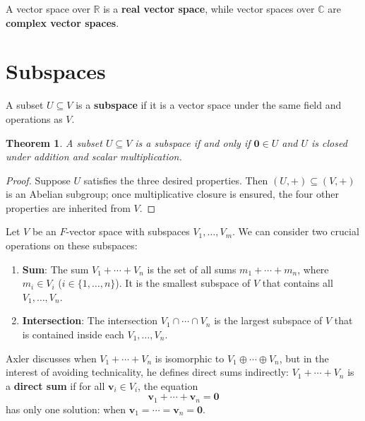 \documentclass[11pt]{article}
\newtheorem{theorem}{Theorem}
\renewcommand{\vec}[1]{\mathbf{#1}}
\begin{document}
A vector space over $\mathbb{R}$ is a \textbf{real vector space}, while vector spaces over $\mathbb{C}$ are \textbf{complex vector spaces}.


\section{Subspaces}

A subset $U \subseteq V$ is a \textbf{subspace} if it is a vector space under the same field and operations as $V$.

\begin{adjustwidth}{0.5cm}{}
  \begin{theorem}
    A subset $U \subseteq V$ is a subspace if and only if $\vec{0} \in U$ and $U$ is closed under addition and scalar multiplication.
  \end{theorem}
  \begin{proof}
    Suppose $U$ satisfies the three desired properties. Then $(U, +) \subseteq (V, +)$ is an Abelian subgroup; once multiplicative closure is ensured, the four other properties are inherited from $V$.
  \end{proof}
\end{adjustwidth}

Let $V$ be an $F$-vector space with subspaces $V_{1}, \ldots, V_{m}$. We can consider two crucial operations on these subspaces: 

\begin{enumerate}
	\item \textbf{Sum}: The sum $V_{1} + \cdots + V_{n}$ is the set of all sums $m_{1} + \cdots + m_{n}$, where $m_{i} \in V_{i}$ ($i \in \{ 1, \ldots, n \}$). It is the smallest subspace of $V$ that contains all $V_{1}, \ldots, V_{n}$.
	\item \textbf{Intersection}: The intersection $V_{1} \cap \cdots \cap V_{n}$ is the largest subspace of $V$ that is contained inside each $V_{1}, \ldots, V_{n}$.
\end{enumerate}

Axler discusses when $V_{1} + \cdots + V_{n}$ is isomorphic to $V_{1} \oplus \cdots \oplus V_{n}$, but in the interest of avoiding technicality, he defines direct sums indirectly: $V_{1} + \cdots + V_{n}$ is a \textbf{direct sum} if for all $\vec{v}_{i} \in V_{i}$, the equation
\[
  \vec{v}_{1} + \cdots + \vec{v}_{n} = \vec{0}
\]
has only one solution: when $\vec{v}_{1} = \cdots = \vec{v}_{n} = \vec{0}$.
\end{document}
